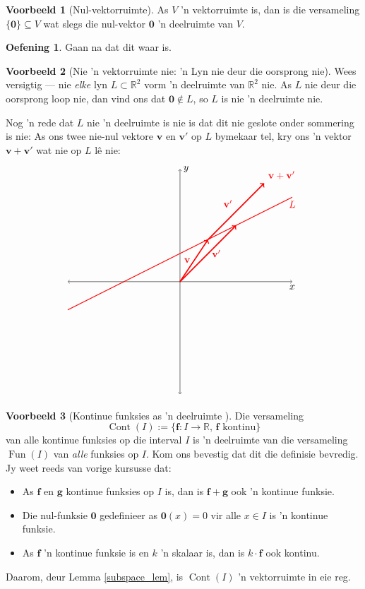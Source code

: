 \documentclass[a4paper,11pt]{book}
\theoremstyle{definition}
\newtheorem{exercise}{Oefening}
\newtheorem{example_environment}{Voorbeeld}[chapter]
\newcommand{\be}{\begin{equation}}
\newcommand{\ee}{\end{equation}}
\newcommand{\ba}{\begin{aligned}}
\newcommand{\ea}{\end{aligned}}
\newcommand{\ve}[1]{\mathbf{#1}}
\newenvironment{example}
	{
		\begin{oframed}
		\begin{example_environment}
	}
	{
		\end{example_environment}
		\end{oframed}
	}
\DeclareMathOperator{\Fun}{Fun}
\DeclareMathOperator{\Cont}{Cont}
\begin{document}
\begin{example}[Nul-vektorruimte] As $V$ 'n vektorruimte is, dan is die
	versameling $\{\ve{0}\} \subseteq V$ wat slegs die nul-vektor $\ve{0}$
	'n deelruimte van $V$.
	\begin{exercise}
		Gaan na dat dit waar is.
	\end{exercise}
\end{example}

\begin{example}[Nie 'n vektorruimte nie: 'n Lyn nie deur die oorsprong nie]
	Wees versigtig --- nie \emph{elke} lyn $L \subset \mathbb{R}^2$ vorm 'n
	deelruimte van  $\mathbb{R}^2$ nie. As $L$ nie deur die oorsprong loop
	nie, dan vind ons dat $\ve{0} \notin L$, so $L$ is nie 'n deelruimte
	nie.

	Nog 'n rede dat $L$ nie 'n deelruimte is nie is dat dit nie geslote
	onder sommering is nie: As ons twee nie-nul vektore $\ve{v}$ en
	$\ve{v}'$ op $L$ bymekaar tel, kry ons 'n vektor $\ve{v} + \ve{v}'$ wat
	nie op $L$ l{\^e} nie:
	\be \label{pic_of_bad_L}
	\ba
	\begin{tikzpicture}[scale=2]
		\draw[<->] (-2, 0) -- (2,0) node[below] {$x$};
		\draw[<->] (0, -2) -- (0, 2) node[right] {$y$};
		\draw[thick, red] (-2, -0.5) -- (2, 1.5) node[below] {$L$};
		\draw[very thick, red, ->] (0,0) -- node[left] {$\ve{v}$} (0.5,
		0.75);
		\draw[very thick, red, ->] (0,0) -- node[right] {$\ve{v}'$} (1, 1);
		\draw[very thick, red, ->] (0.5,0.75) -- node[above left]
		{$\ve{v}'$} (1.5, 1.75) node[above right] {$\ve{v} + \ve{v}'$};
	\end{tikzpicture}
\ea
\ee
\end{example}



\begin{example}[Kontinue funksies as 'n deelruimte ] Die versameling
	\[
		\Cont(I) := \{ \ve{f}: I \rightarrow \mathbb{R}, \, \ve{f} 
		\mbox{ kontinu} \}
	\]
	van alle kontinue funksies op die interval $I$ is 'n deelruimte van die
	versameling $\Fun(I)$ van \emph{alle} funksies op $I$. Kom ons bevestig
	dat dit die definisie bevredig. Jy weet reeds van vorige kursusse dat:
	\begin{itemize}
		\item As $\ve{f}$ en $\ve{g}$ kontinue funksies op $I$ is, dan is
			$\ve{f} + \ve{g}$ ook 'n kontinue funksie.
		\item Die nul-funksie $\ve{0}$ gedefinieer as $\ve{0}(x) = 0$ vir
			alle $x \in I$ is 'n kontinue funksie.
		\item As $\ve{f}$ 'n kontinue funksie is en $k$ 'n skalaar is, dan
			is $k \cdot \ve{f}$ ook kontinu.
	\end{itemize}
	Daarom, deur Lemma \ref{subspace_lem}, is $\Cont(I)$ 'n vektorruimte in
	eie reg.
\end{example}
\end{document}
